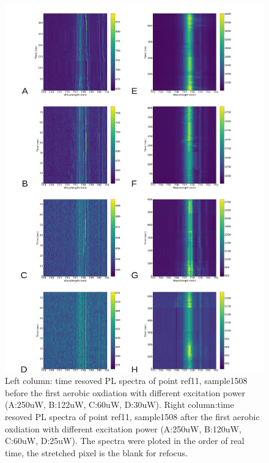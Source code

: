 \begin{figure}[h]
\centering
\includegraphics[width=1\linewidth]{Figures/pic/powerdependenceref11}
\caption{Left column: time resoved PL spectra of point ref11, sample1508 before the first aerobic oxdiation with different excitation power (A:250uW, B:122uW, C:60uW, D:30uW). Right column:time resoved PL spectra of point ref11, sample1508 after the first aerobic oxdiation with different excitation power (A:250uW, B:120uW, C:60uW, D:25uW). The spectra were ploted in the order of real time, the stretched pixel is the blank for refocus.}
\label{fig:powerdependenceref11}
\end{figure}
